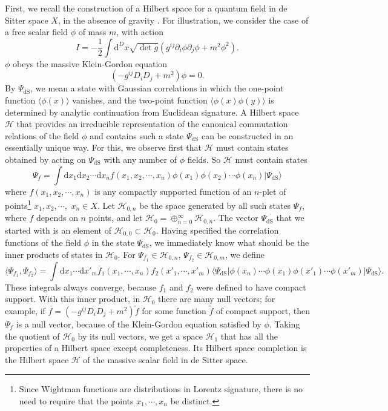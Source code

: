\documentclass[11pt,a4paper]{article}
\def\t{{ \sf t}}
\def\be{\begin{equation}}
\def\ee{\end{equation}}
\def\d{{\mathrm d}}
\def\t{\widetilde }
\def\H{{\mathcal H}}
\def\bar{\overline}
\def\dS{{\mathrm{dS}}}
\def\la{\langle}
\def\ra{\rangle}
\begin{document}
  First, we recall the construction of a Hilbert space for a quantum field in de Sitter space $X$, in the absence of gravity \cite{CT,SS,BD,Mo,Al}.  For illustration,
  we consider the case of a free scalar field $\phi$ of mass $m$, with action
  \be\label{scalaction}I=-\frac{1}{2}\int\d^D x \sqrt{\det g} \left(g^{ij}\partial_i\phi\partial_j\phi +m^2\phi^2\right).\ee
  $\phi$ obeys the massive Klein-Gordon equation
  \be\label{kgeqn}\left(-g^{ij}D_i D_j +m^2\right)\phi=0. \ee
By $\Psi_\dS$, we mean a state with Gaussian correlations  in which the one-point function $\la\phi(x)\ra$ vanishes, and
the two-point function $\la\phi(x)\phi(y)\ra$ is determined by analytic continuation from Euclidean signature.   A Hilbert space $\H$ that provides an
irreducible representation of the canonical commutation relations of the field $\phi$ and contains such a state $\Psi_\dS$ can be constructed in an essentially
unique way.   For this, we observe first that $\H$ must contain states obtained by acting on $\Psi_\dS$ with any number of $\phi$ fields.   So $\H$ must contain states
\be\label{zeqn}\Psi_f = \int \d x_1\d x_2 \cdots \d x_n f(x_1,x_2,\cdots , x_n) \phi(x_1) \phi(x_2)\cdots \phi(x_n) |\Psi_\dS\ra\ee
where $f(x_1,x_2,\cdots, x_n)$ is any compactly supported function of an $n$-plet of  points\footnote{Since Wightman functions are distributions in Lorentz
signature, there is no need to require that the points $x_1,\cdots, x_n$ be distinct.}  $x_1,x_2,\cdots,$ $x_n\in X$.  
Let $\H_{0,n}$ be the space generated by all such states $\Psi_f$, where $f$ depends on $n$ points, and let $\H_0=\oplus_{n=0}^\infty \H_{0,n}$.    The vector $\Psi_\dS$ that we started with is an element of 
$\H_{0,0}\subset \H_0$.  
Having specified the correlation
functions of the field $\phi$ in the state $\Psi_\dS$, we immediately know what should be the inner products of states  in $\H_0$.
For $\Psi_{f_1}\in \H_{0,n}$, $\Psi_{f_2}\in \H_{0,m}$, we define
 \be       \label{weqn}\la \Psi_{f_1},\Psi_{f_2}\ra=\int \d x_1\cdots \d x'_m \bar f_1(x_1,\cdots, x_n) f_2(x'_1,\cdots, x'_m)
\la\Psi_\dS|\phi(x_n)\cdots \phi(x_1)\phi(x'_1)\cdots \phi(x'_m)|\Psi_\dS\ra. \ee
These integrals always converge, because $f_1$ and $f_2$ were defined to have compact support.
With this inner product, in $\H_0$ there are many null vectors; for example, if  $f=(-g^{ij}D_i D_j+m^2)\t f$ for some function $\t f$ of compact support, 
then $\Psi_f$ is a null vector,
because of the Klein-Gordon equation satisfied by $\phi$.
  Taking the quotient of $\H_0$ by its null vectors, we get a space $\H_1$ that
has all the properties of a Hilbert space except completeness.  Its Hilbert space completion is the Hilbert space $\H$ of the massive scalar field in de Sitter space.
\end{document}
